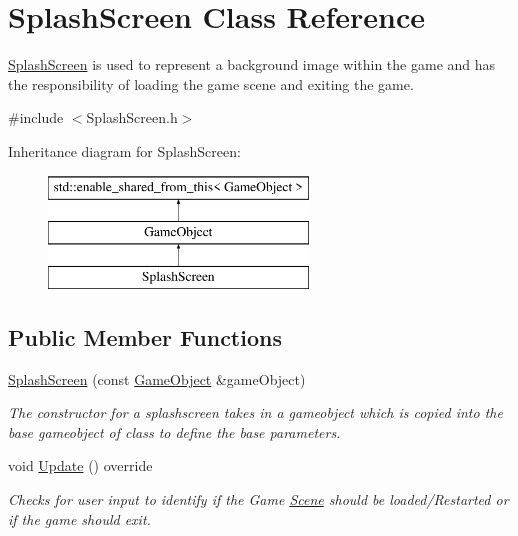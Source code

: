 \hypertarget{class_splash_screen}{}\section{Splash\+Screen Class Reference}
\label{class_splash_screen}


\hyperlink{class_splash_screen}{Splash\+Screen} is used to represent a background image within the game and has the responsibility of loading the game scene and exiting the game.  




{\ttfamily \#include $<$Splash\+Screen.\+h$>$}

Inheritance diagram for Splash\+Screen\+:\begin{figure}[H]
\begin{center}
\leavevmode
\includegraphics[height=3.000000cm]{da/d1c/class_splash_screen}
\end{center}
\end{figure}
\subsection*{Public Member Functions}
\begin{DoxyCompactItemize}
\item 
\hyperlink{class_splash_screen_afefa0db946b214828634c7f2550677e6}{Splash\+Screen} (const \hyperlink{class_game_object}{Game\+Object} \&game\+Object)
\begin{DoxyCompactList}\small\item\em The constructor for a splashscreen takes in a gameobject which is copied into the base gameobject of class to define the base parameters. \end{DoxyCompactList}\item 
\mbox{\label{class_splash_screen_af78b8eab226a89fec389e53cbf3ed9e8}} 
void \hyperlink{class_splash_screen_af78b8eab226a89fec389e53cbf3ed9e8}{Update} () override
\begin{DoxyCompactList}\small\item\em Checks for user input to identify if the Game \hyperlink{class_scene}{Scene} should be loaded/\+Restarted or if the game should exit. \end{DoxyCompactList}\end{DoxyCompactItemize}

